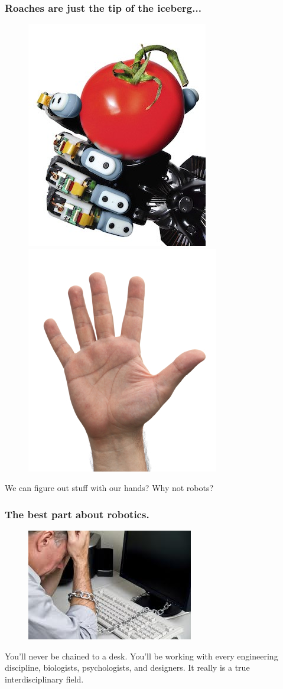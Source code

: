 \documentclass[compress]{beamer}
\begin{document}
\begin{frame}
  \frametitle{Roaches are just the tip of the iceberg...}
  \begin{figure}
    \includegraphics[width=0.35\linewidth]{robohand.jpg}
    \quad
    \includegraphics[width=0.35\linewidth]{hand.jpg}
  \end{figure}     
 We can figure out stuff with our hands? Why not robots?
\end{frame}
\begin{frame}
  \frametitle{The best part about robotics.}
  \begin{figure}
    \includegraphics[width=0.5\linewidth]{chained.jpg}
  \end{figure}     
  You'll never be chained to a desk. You'll be working with every engineering discipline, biologists, psychologists, and designers. It really is a true interdisciplinary field. 
\end{frame}
\end{document}
